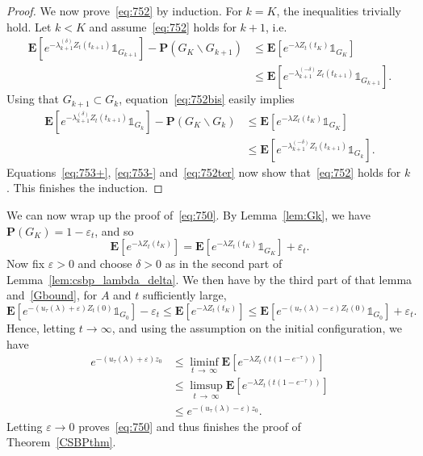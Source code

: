 \documentclass[10pt]{amsart}
\theoremstyle{definition}\newtheorem{defi}[theo]{Definition}\newtheorem{rema}[theo]{Remark}\newtheorem{exam}[theo]{Example}\newtheorem{exem}[theo]{Example}\newtheorem{nota}[theo]{Notation}
\newcommand*\ep{\varepsilon}
\newcommand*\eps{\varepsilon}
\newcommand*\E{\mathbf{E}}
\renewcommand*\P{\mathbf{P}}
\newcommand{\1} {\mathds{1}}
\renewcommand*\to{\rightarrow}
\begin{document}
\begin{proof}
We now prove~\eqref{eq:752} by induction. For $k=K$, the inequalities trivially hold. Let $k<K$ and assume~\eqref{eq:752} holds for $k+1$, i.e.
\begin{equation}\label{eq:752bis}
\begin{split}
\E\left[e^{-\lambda_{k+1}^{(\delta)}Z_t\left(t_{k+1}\right)}\1_{G_{k+1}}\right] -\P\left(G_K\backslash G_{k+1}\right)
&\le \E\left[e^{-\lambda Z_t(t_K)}\1_{G_K}\right]\\
&\le \E\left[e^{-\lambda_{k+1}^{(-\delta)}Z_t\left(t_{k+1}\right)}\1_{G_{k+1}}\right].
\end{split}
\end{equation}
Using that $G_{k+1}\subset G_k$, equation~\eqref{eq:752bis} easily implies
\begin{equation}\label{eq:752ter}
\begin{split}
\E\left[e^{-\lambda_{k+1}^{(\delta)}Z_t\left(t_{k+1}\right)}\1_{G_k}\right] -\P\left(G_K\backslash G_k\right)
&\le \E\left[e^{-\lambda Z_t(t_K)}\1_{G_K}\right]\\
&\le \E\left[e^{-\lambda_{k+1}^{(-\delta)}Z_t\left(t_{k+1}\right)}\1_{G_k}\right].
\end{split}
\end{equation}
Equations~\eqref{eq:753+}, \eqref{eq:753-} and~\eqref{eq:752ter} now show that~\eqref{eq:752} holds for $k$. This finishes the induction.
\end{proof}

We can now wrap up the proof of~\eqref{eq:750}. By Lemma~\ref{lem:Gk}, we have $\P(G_K) = 1-\eps_t$, and so
\begin{equation}\label{Gbound}
\E\left[e^{-\lambda Z_t(t_K)}\right] = \E\left[e^{-\lambda Z_t(t_K)}\1_{G_K}\right] + \eps_t.
\end{equation}
Now fix $\ep>0$ and choose $\delta>0$ as in the second part of Lemma~\ref{lem:csbp_lambda_delta}. We then have by the third part of that lemma and~\eqref{Gbound}, for $A$ and $t$ sufficiently large,
\[
\E\left[e^{-\left(u_\tau(\lambda)+\ep\right)Z_t(0)}\1_{G_0}\right]-\eps_t\le \E\left[e^{-\lambda Z_t(t_K)}\right] \le \E\left[e^{-\left(u_\tau(\lambda)-\ep\right)Z_t(0)}\1_{G_0}\right]+\eps_t.
\]
Hence, letting $t\to\infty$, and using the assumption on the initial configuration, we have
\begin{align*}
e^{-\left(u_\tau(\lambda)+\ep\right)z_0} &\le \liminf_{t\,\to\,\infty} \E\left[e^{-\lambda Z_t\left(t\left(1-e^{-\tau}\right)\right)}\right]\\ &\le \limsup_{t\,\to\,\infty} \E\left[e^{-\lambda Z_t\left(t\left(1-e^{-\tau}\right)\right)}\right] \\
&\le e^{-\left(u_\tau(\lambda)-\ep\right)z_0}.
\end{align*}
Letting $\ep \to0$ proves~\eqref{eq:750} and thus finishes the proof of Theorem~\ref{CSBPthm}.
\vspace{45pt}
\end{document}
